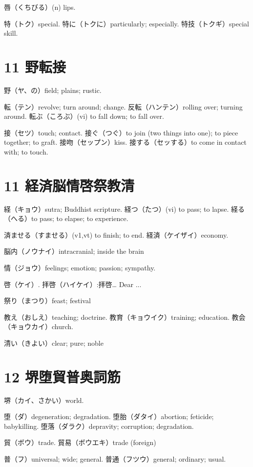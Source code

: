 唇（くちびる）(n) lips.

特（トク）special.
特に（トクに）particularly; especially.
特技（トクギ）special skill.

\section{11 野転接}

野（ヤ、の）field; plains; rustic.

転（テン）revolve; turn around; change.
反転（ハンテン）rolling over; turning around.
転ぶ（ころぶ）(vi) to fall down; to fall over.

接（セツ）touch; contact.
接ぐ（つぐ）to join (two things into one); to piece together; to graft.
接吻（セップン）kiss.
接する（セッする）to come in contact with; to touch.

\section{11 経済脳情啓祭教清}

経（キョウ）sutra; Buddhist scripture.
経つ（たつ）(vi) to pass; to lapse.
経る（へる）to pass; to elapse; to experience.

済ませる（すませる）(v1,vt) to finish; to end.
経済（ケイザイ）economy.

脳内（ノウナイ）intracranial; inside the brain

情（ジョウ）feelings; emotion; passion; sympathy.

啓（ケイ）.
拝啓（ハイケイ）:拝啓… Dear ...

祭り（まつり）feast; festival

教え（おしえ）teaching; doctrine.
教育（キョウイク）training; education.
教会（キョウカイ）church.

清い（きよい）clear; pure; noble

\section{12 堺堕貿普奥詞筋}

堺（カイ、さかい）world.

堕（ダ）degeneration; degradation.
堕胎（ダタイ）abortion; feticide; babykilling.
堕落（ダラク）depravity; corruption; degradation.

貿（ボウ）trade.
貿易（ボウエキ）trade (foreign)

普（フ）universal; wide; general.
普通（フツウ）general; ordinary; usual.

